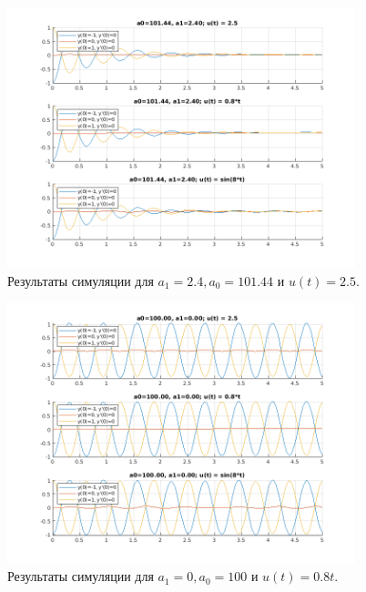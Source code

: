 \begin{figure}
    \centering
    \includegraphics[width=0.9\textwidth]{figs/task_1_out_1.png}
    \caption{Результаты симуляции для $a_1 = 2.4, a_0 = 101.44$ и $u(t) = 2.5$.}
    \label{fig:task_1_out_1}
\end{figure}

\begin{figure}
    \centering
    \includegraphics[width=0.9\textwidth]{figs/task_1_out_2.png}
    \caption{Результаты симуляции для $a_1 = 0, a_0 = 100$ и $u(t) = 0.8t$.}
    \label{fig:task_1_out_2}
\end{figure}

